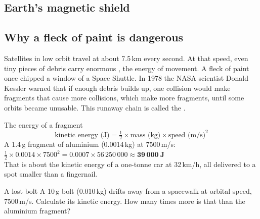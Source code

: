 \begin{keyvocab}
\end{keyvocab}

\subsection{Earth's magnetic shield}\label{sub:a2.1}


\begin{youdobox}
\answerbox{1.6cm}

\answerbox{1.6cm}

\answerbox{1.6cm}
\end{youdobox}

\subsection{Why a fleck of paint is dangerous}\label{sub:a2.2}

Satellites in low orbit travel at about 7.5\,km every second. At that speed, even tiny pieces of debris carry enormous , the energy of movement. A fleck of paint once chipped a window of a Space Shuttle. In 1978 the NASA scientist Donald Kessler warned that if enough debris builds up, one collision would make fragments that cause more collisions, which make more fragments, until some orbits became unusable. This runaway chain is called the .

\begin{idobox}{The energy of a fragment}
\[ \text{kinetic energy (J)} = \tfrac{1}{2} \times \text{mass (kg)} \times \text{speed (m/s)}^2 \]
A 1.4\,g fragment of aluminium (0.0014\,kg) at 7500\,m/s:\\
$\tfrac{1}{2} \times 0.0014 \times 7500^2 = 0.0007 \times 56\,250\,000 \approx \mathbf{39\,000\ J}$\\
That is about the kinetic energy of a one-tonne car at 32\,km/h, all delivered to a spot smaller than a fingernail.
\end{idobox}

\begin{wedobox}{A lost bolt}
A 10\,g bolt (0.010\,kg) drifts away from a spacewalk at orbital speed, 7500\,m/s. Calculate its kinetic energy. How many times more is that than the aluminium fragment?
\workbox{4.5cm}
\end{wedobox}

